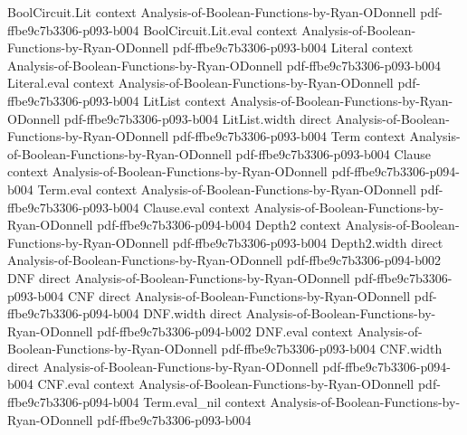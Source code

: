 \begin{lemma}
\label{BooleanAnalysis.parity_eq_chi_univ}
\leanok
{}
\proofstep
  {BoolCircuit.Lit}
  {context}
  {Analysis-of-Boolean-Functions-by-Ryan-ODonnell}
  {pdf-ffbe9c7b3306-p093-b004}
\proofstep
  {BoolCircuit.Lit.eval}
  {context}
  {Analysis-of-Boolean-Functions-by-Ryan-ODonnell}
  {pdf-ffbe9c7b3306-p093-b004}
\proofstep
  {Literal}
  {context}
  {Analysis-of-Boolean-Functions-by-Ryan-ODonnell}
  {pdf-ffbe9c7b3306-p093-b004}
\proofstep
  {Literal.eval}
  {context}
  {Analysis-of-Boolean-Functions-by-Ryan-ODonnell}
  {pdf-ffbe9c7b3306-p093-b004}
\proofstep
  {LitList}
  {context}
  {Analysis-of-Boolean-Functions-by-Ryan-ODonnell}
  {pdf-ffbe9c7b3306-p093-b004}
\proofstep
  {LitList.width}
  {direct}
  {Analysis-of-Boolean-Functions-by-Ryan-ODonnell}
  {pdf-ffbe9c7b3306-p093-b004}
\proofstep
  {Term}
  {context}
  {Analysis-of-Boolean-Functions-by-Ryan-ODonnell}
  {pdf-ffbe9c7b3306-p093-b004}
\proofstep
  {Clause}
  {context}
  {Analysis-of-Boolean-Functions-by-Ryan-ODonnell}
  {pdf-ffbe9c7b3306-p094-b004}
\proofstep
  {Term.eval}
  {context}
  {Analysis-of-Boolean-Functions-by-Ryan-ODonnell}
  {pdf-ffbe9c7b3306-p093-b004}
\proofstep
  {Clause.eval}
  {context}
  {Analysis-of-Boolean-Functions-by-Ryan-ODonnell}
  {pdf-ffbe9c7b3306-p094-b004}
\proofstep
  {Depth2}
  {context}
  {Analysis-of-Boolean-Functions-by-Ryan-ODonnell}
  {pdf-ffbe9c7b3306-p093-b004}
\proofstep
  {Depth2.width}
  {direct}
  {Analysis-of-Boolean-Functions-by-Ryan-ODonnell}
  {pdf-ffbe9c7b3306-p094-b002}
\proofstep
  {DNF}
  {direct}
  {Analysis-of-Boolean-Functions-by-Ryan-ODonnell}
  {pdf-ffbe9c7b3306-p093-b004}
\proofstep
  {CNF}
  {direct}
  {Analysis-of-Boolean-Functions-by-Ryan-ODonnell}
  {pdf-ffbe9c7b3306-p094-b004}
\proofstep
  {DNF.width}
  {direct}
  {Analysis-of-Boolean-Functions-by-Ryan-ODonnell}
  {pdf-ffbe9c7b3306-p094-b002}
\proofstep
  {DNF.eval}
  {context}
  {Analysis-of-Boolean-Functions-by-Ryan-ODonnell}
  {pdf-ffbe9c7b3306-p093-b004}
\proofstep
  {CNF.width}
  {direct}
  {Analysis-of-Boolean-Functions-by-Ryan-ODonnell}
  {pdf-ffbe9c7b3306-p094-b004}
\proofstep
  {CNF.eval}
  {context}
  {Analysis-of-Boolean-Functions-by-Ryan-ODonnell}
  {pdf-ffbe9c7b3306-p094-b004}
\proofstep
  {Term.eval_nil}
  {context}
  {Analysis-of-Boolean-Functions-by-Ryan-ODonnell}
  {pdf-ffbe9c7b3306-p093-b004}
\proofstep

\end{lemma}
